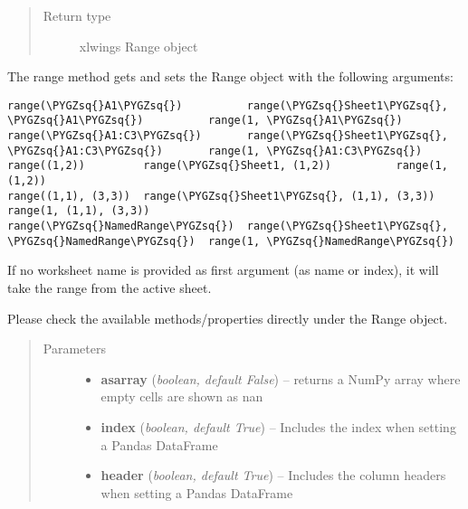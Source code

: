 \documentclass[letterpaper,11pt,english]{sphinxmanual}
\def\PYGZsq{\char`\'}
\begin{document}
\begin{fulllineitems}
\begin{fulllineitems}
\begin{quote}
\begin{description}
\item[{Return type}] \leavevmode
xlwings Range object

\end{description}\end{quote}

\end{fulllineitems}


\begin{fulllineitems}
\label{workbook:xlwings.Workbook.range}
The range method gets and sets the Range object with the following arguments:

\begin{Verbatim}[commandchars=\\\{\}]
range(\PYGZsq{}A1\PYGZsq{})          range(\PYGZsq{}Sheet1\PYGZsq{}, \PYGZsq{}A1\PYGZsq{})          range(1, \PYGZsq{}A1\PYGZsq{})
range(\PYGZsq{}A1:C3\PYGZsq{})       range(\PYGZsq{}Sheet1\PYGZsq{}, \PYGZsq{}A1:C3\PYGZsq{})       range(1, \PYGZsq{}A1:C3\PYGZsq{})
range((1,2))         range(\PYGZsq{}Sheet1, (1,2))          range(1, (1,2))
range((1,1), (3,3))  range(\PYGZsq{}Sheet1\PYGZsq{}, (1,1), (3,3))  range(1, (1,1), (3,3))
range(\PYGZsq{}NamedRange\PYGZsq{})  range(\PYGZsq{}Sheet1\PYGZsq{}, \PYGZsq{}NamedRange\PYGZsq{})  range(1, \PYGZsq{}NamedRange\PYGZsq{})
\end{Verbatim}

If no worksheet name is provided as first argument (as name or index),
it will take the range from the active sheet.

Please check the available methods/properties directly under the Range object.
\begin{quote}\begin{description}
\item[{Parameters}] \leavevmode\begin{itemize}
\item {} 
\textbf{asarray} (\emph{boolean, default False}) -- returns a NumPy array where empty cells are shown as nan

\item {} 
\textbf{index} (\emph{boolean, default True}) -- Includes the index when setting a Pandas DataFrame

\item {} 
\textbf{header} (\emph{boolean, default True}) -- Includes the column headers when setting a Pandas DataFrame


\end{itemize}
\end{description}
\end{quote}
\end{fulllineitems}
\end{fulllineitems}
\end{document}
